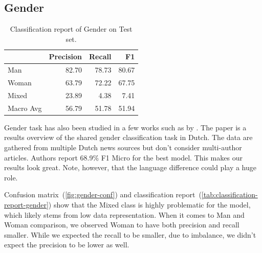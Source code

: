 \subsection{Gender}
\begin{table}[h]
    \centering\footnotesize\sf
    \begin{tabular}{lrrr}
        \toprule
        {}        & Precision & Recall & F1    \\
        \midrule
        Man       & 82.70     & 78.73  & 80.67 \\
        Woman     & 63.79     & 72.22  & 67.75 \\
        Mixed     & 23.89     & 4.38   & 7.41  \\
        Macro Avg & 56.79     & 51.78  & 51.94 \\
        \bottomrule
    \end{tabular}
    \caption{Classification report of Gender on Test set.}
    \label{tab:classification-report-gender}
\end{table}
Gender task has also been studied in a few works such as by \cite{haagsma2019overview}
. The paper is a results overview of the shared gender classification task in Dutch.
The data are gathered from multiple Dutch news sources but
don't consider multi-author articles. Authors report 68.9\% F1 Micro for the best model.
This makes our results look great. Note, however, that the language difference could play
a huge role.

Confusion matrix~(\autoref{fig:gender-conf}) and classification report~(\autoref{tab:classification-report-gender})
show that the Mixed class is highly problematic for the model, which likely stems from low data representation.
When it comes to Man and Woman comparison, we observed Woman to have both precision and recall smaller. While we expected
the recall to be smaller, due to imbalance, we didn't expect the precision to be lower as well.
